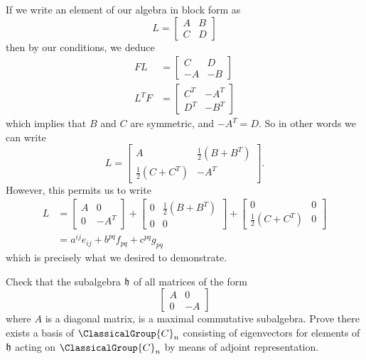 \answer If we write an element of our algebra in block form as
\begin{equation}
L = \begin{bmatrix}
A&B\\C&D\end{bmatrix}
\end{equation}
then by our conditions, we deduce
\begin{subequations}
\begin{align}
FL &= \begin{bmatrix}C&D\\-A&-B\end{bmatrix}\\
L^{T}F&=\begin{bmatrix}C^{T}&-A^{T}\\D^{T}&-B^{T}\end{bmatrix}
\end{align}
\end{subequations}
which implies that $B$ and $C$ are symmetric, and $-A^{T}=D$. So
in other words we can write
\begin{equation}
L = \begin{bmatrix} A & \frac{1}{2}(B+B^{T})\\
\frac{1}{2}(C+C^{T}) & -A^{T}
\end{bmatrix}.
\end{equation}
However, this permits us to write
\begin{subequations}
\begin{align}
L &= \begin{bmatrix}A&0\\0&-A^{T}
\end{bmatrix}+\begin{bmatrix}0&\frac{1}{2}(B+B^{T})\\
0&0
\end{bmatrix}+\begin{bmatrix}0&0\\
\frac{1}{2}(C+C^{T})&0
\end{bmatrix}\\
&=a^{ij}e_{ij}+b^{pq}f_{pq}+c^{pq}g_{pq}
\end{align}
\end{subequations}
which is precisely what we desired to demonstrate.

\begin{exercise}
Check that the subalgebra $\frak{h}$ of all matrices of the form
\begin{equation}
\begin{bmatrix}
A&0\\
0&-A
\end{bmatrix}
\end{equation}
where $A$ is a diagonal matrix, is a maximal commutative
subalgebra. Prove there exists a basis of $\ClassicalGroup{C}_{n}$ consisting of
eigenvectors for elements of $\frak{h}$ acting on $\ClassicalGroup{C}_{n}$ by
means of adjoint representation.
\end{exercise}

